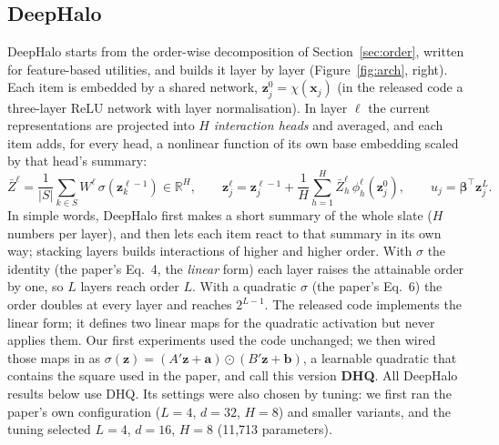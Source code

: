 \documentclass[11pt,a4paper]{article}
\numberwithin{table}{section}
\numberwithin{figure}{section}
\numberwithin{equation}{section}
\begin{document}
\subsection{DeepHalo}
DeepHalo \citep{zhang2025} starts from the order-wise decomposition of Section~\ref{sec:order}, written for feature-based utilities, and builds it layer by layer (Figure~\ref{fig:arch}, right). Each item is embedded by a shared network, $\mathbf z^0_j=\chi(\mathbf x_j)$ (in the released code a three-layer ReLU network with layer normalisation). In layer $\ell$ the current representations are projected into $H$ \emph{interaction heads} and averaged, and each item adds, for every head, a nonlinear function of its own base embedding scaled by that head's summary:
\begin{equation}\label{eq:dh}
\bar Z^{\ell}=\frac{1}{|S|}\sum_{k\in S}W^{\ell}\,\sigma(\mathbf z^{\ell-1}_k)\in\mathbb R^H,\qquad
\mathbf z^{\ell}_j=\mathbf z^{\ell-1}_j+\frac1H\sum_{h=1}^{H}\bar Z^{\ell}_h\,\phi^{\ell}_h(\mathbf z^0_j),\qquad u_j=\bm\beta^{\top}\mathbf z^L_j .
\end{equation}
In simple words, DeepHalo first makes a short summary of the whole slate ($H$ numbers per layer), and then lets each item react to that summary in its own way; stacking layers builds interactions of higher and higher order. With $\sigma$ the identity (the paper's Eq.~4, the \emph{linear} form) each layer raises the attainable order by one, so $L$ layers reach order $L$. With a quadratic $\sigma$ (the paper's Eq.~6) the order doubles at every layer and reaches $2^{L-1}$. The released code implements the linear form; it defines two linear maps for the quadratic activation but never applies them. Our first experiments used the code unchanged; we then wired those maps in as $\sigma(\mathbf z)=(A'\mathbf z+\mathbf a)\odot(B'\mathbf z+\mathbf b)$, a learnable quadratic that contains the square used in the paper, and call this version \textbf{DHQ}. All DeepHalo results below use DHQ. Its settings were also chosen by tuning: we first ran the paper's own configuration ($L=4$, $d=32$, $H=8$) and smaller variants, and the tuning selected $L=4$, $d=16$, $H=8$ (11,713 parameters).
\end{document}
